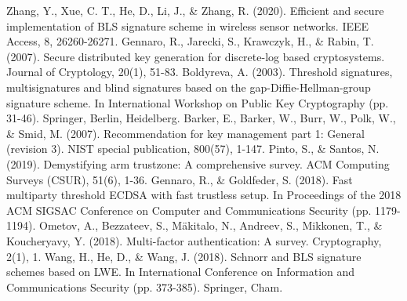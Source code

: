 \begin{thebibliography}{99}
     Zhang, Y., Xue, C. T., He, D., Li, J., \& Zhang, R. (2020). Efficient and secure implementation of BLS signature scheme in wireless sensor networks. IEEE Access, 8, 26260-26271.
     Gennaro, R., Jarecki, S., Krawczyk, H., \& Rabin, T. (2007). Secure distributed key generation for discrete-log based cryptosystems. Journal of Cryptology, 20(1), 51-83.
     Boldyreva, A. (2003). Threshold signatures, multisignatures and blind signatures based on the gap-Diffie-Hellman-group signature scheme. In International Workshop on Public Key Cryptography (pp. 31-46). Springer, Berlin, Heidelberg.
     Barker, E., Barker, W., Burr, W., Polk, W., \& Smid, M. (2007). Recommendation for key management part 1: General (revision 3). NIST special publication, 800(57), 1-147.
     Pinto, S., \& Santos, N. (2019). Demystifying arm trustzone: A comprehensive survey. ACM Computing Surveys (CSUR), 51(6), 1-36.
     Gennaro, R., \& Goldfeder, S. (2018). Fast multiparty threshold ECDSA with fast trustless setup. In Proceedings of the 2018 ACM SIGSAC Conference on Computer and Communications Security (pp. 1179-1194).
     Ometov, A., Bezzateev, S., Mäkitalo, N., Andreev, S., Mikkonen, T., \& Koucheryavy, Y. (2018). Multi-factor authentication: A survey. Cryptography, 2(1), 1.
     Wang, H., He, D., \& Wang, J. (2018). Schnorr and BLS signature schemes based on LWE. In International Conference on Information and Communications Security (pp. 373-385). Springer, Cham.
\end{thebibliography}
